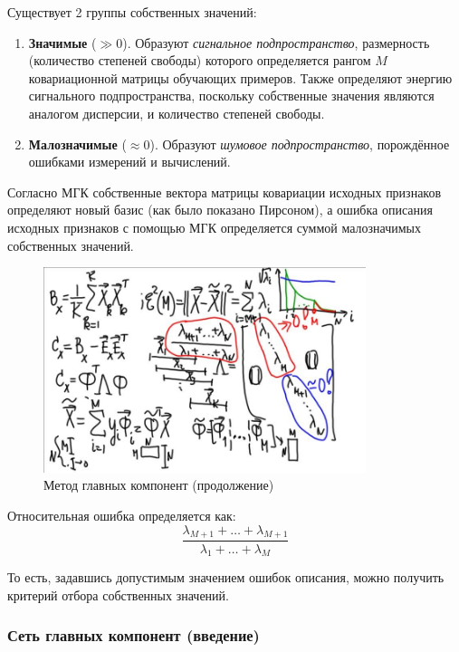 \documentclass{article}
\numberwithin{equation}{subsection}
\begin{document}
Существует 2 группы собственных значений: 

\begin{enumerate}
    \item \textbf{Значимые} ($\gg0$). Образуют \textit{сигнальное подпространство},
        размерность (количество степеней свободы) которого определяется рангом $M$ 
        ковариационной матрицы обучающих примеров.
        Также определяют энергию сигнального подпространства, поскольку собственные значения 
        являются аналогом дисперсии, и количество степеней свободы.
    \item \textbf{Малозначимые} ($\approx 0$). Образуют \textit{шумовое подпространство},
        порождённое ошибками измерений и вычислений.
\end{enumerate}

Согласно МГК собственные вектора матрицы ковариации исходных признаков определяют новый
базис (как было показано Пирсоном), а ошибка описания исходных признаков с помощью МГК
определяется суммой малозначимых собственных значений.

\begin{figure}[htbp]
    \centering
    \includegraphics[height=6cm]{hyperflat_12__1.jpeg}
    \caption{Метод главных компонент (продолжение)}
    \label{hyperflat_12__1}
\end{figure}

Относительная ошибка определяется как:
\begin{equation}
    \dfrac{\lambda_{M+1}+\dots+\lambda_{M+1}}{\lambda_1+\dots+\lambda_M}
\end{equation}

То есть, задавшись допустимым значением ошибок описания, можно получить критерий отбора
собственных значений.




\subsubsection{Сеть главных компонент (введение)}
\end{document}
